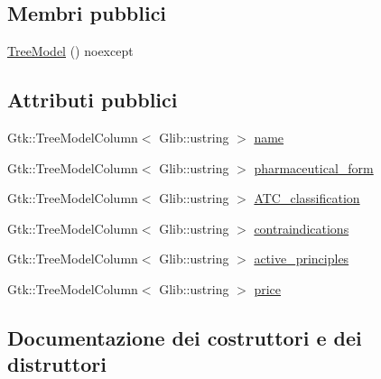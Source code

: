 \subsection*{Membri pubblici}
\begin{DoxyCompactItemize}
\item 
\hyperlink{structmm_1_1model_1_1_drug_1_1_tree_model_ae0aec47ef95a2143bea49ed0058d5778}{Tree\+Model} () noexcept
\end{DoxyCompactItemize}
\subsection*{Attributi pubblici}
\begin{DoxyCompactItemize}
\item 
Gtk\+::\+Tree\+Model\+Column$<$ Glib\+::ustring $>$ \hyperlink{structmm_1_1model_1_1_drug_1_1_tree_model_a21ecd0c62d35f3a4f2e16253d5faa09c}{name}
\item 
Gtk\+::\+Tree\+Model\+Column$<$ Glib\+::ustring $>$ \hyperlink{structmm_1_1model_1_1_drug_1_1_tree_model_a29443772824bbfc47d5c61e5e5c46050}{pharmaceutical\+\_\+form}
\item 
Gtk\+::\+Tree\+Model\+Column$<$ Glib\+::ustring $>$ \hyperlink{structmm_1_1model_1_1_drug_1_1_tree_model_abdc7bfea0985a9082361575803b78d0e}{A\+T\+C\+\_\+classification}
\item 
Gtk\+::\+Tree\+Model\+Column$<$ Glib\+::ustring $>$ \hyperlink{structmm_1_1model_1_1_drug_1_1_tree_model_a975dd1b785590092258796e842cd5bf5}{contraindications}
\item 
Gtk\+::\+Tree\+Model\+Column$<$ Glib\+::ustring $>$ \hyperlink{structmm_1_1model_1_1_drug_1_1_tree_model_a0ad53d6e45f9001d07e350ab7866f1da}{active\+\_\+principles}
\item 
Gtk\+::\+Tree\+Model\+Column$<$ Glib\+::ustring $>$ \hyperlink{structmm_1_1model_1_1_drug_1_1_tree_model_a89b06b1ccb81a349452bdb9273867269}{price}
\end{DoxyCompactItemize}


\subsection{Documentazione dei costruttori e dei distruttori}
\mbox{\label{structmm_1_1model_1_1_drug_1_1_tree_model_ae0aec47ef95a2143bea49ed0058d5778}} 
